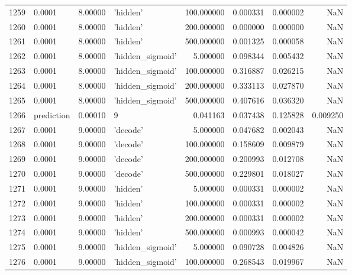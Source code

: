 \documentclass[10pt,a4paper]{article}
\begin{document}
\begin{tabular}{llrlrrrr}
1259 &      0.0001 &   8.00000 &           'hidden' &  100.000000 &  0.000331 &  0.000002 &       NaN \\
1260 &      0.0001 &   8.00000 &           'hidden' &  200.000000 &  0.000000 &  0.000000 &       NaN \\
1261 &      0.0001 &   8.00000 &           'hidden' &  500.000000 &  0.001325 &  0.000058 &       NaN \\
1262 &      0.0001 &   8.00000 &   'hidden\_sigmoid' &    5.000000 &  0.098344 &  0.005432 &       NaN \\
1263 &      0.0001 &   8.00000 &   'hidden\_sigmoid' &  100.000000 &  0.316887 &  0.026215 &       NaN \\
1264 &      0.0001 &   8.00000 &   'hidden\_sigmoid' &  200.000000 &  0.333113 &  0.027870 &       NaN \\
1265 &      0.0001 &   8.00000 &   'hidden\_sigmoid' &  500.000000 &  0.407616 &  0.036320 &       NaN \\
1266 &  prediction &   0.00010 &                  9 &    0.041163 &  0.037438 &  0.125828 &  0.009250 \\
1267 &      0.0001 &   9.00000 &           'decode' &    5.000000 &  0.047682 &  0.002043 &       NaN \\
1268 &      0.0001 &   9.00000 &           'decode' &  100.000000 &  0.158609 &  0.009879 &       NaN \\
1269 &      0.0001 &   9.00000 &           'decode' &  200.000000 &  0.200993 &  0.012708 &       NaN \\
1270 &      0.0001 &   9.00000 &           'decode' &  500.000000 &  0.229801 &  0.018027 &       NaN \\
1271 &      0.0001 &   9.00000 &           'hidden' &    5.000000 &  0.000331 &  0.000002 &       NaN \\
1272 &      0.0001 &   9.00000 &           'hidden' &  100.000000 &  0.000331 &  0.000002 &       NaN \\
1273 &      0.0001 &   9.00000 &           'hidden' &  200.000000 &  0.000331 &  0.000002 &       NaN \\
1274 &      0.0001 &   9.00000 &           'hidden' &  500.000000 &  0.000993 &  0.000042 &       NaN \\
1275 &      0.0001 &   9.00000 &   'hidden\_sigmoid' &    5.000000 &  0.090728 &  0.004826 &       NaN \\
1276 &      0.0001 &   9.00000 &   'hidden\_sigmoid' &  100.000000 &  0.268543 &  0.019967 &       NaN \\

\end{tabular}
\end{document}
